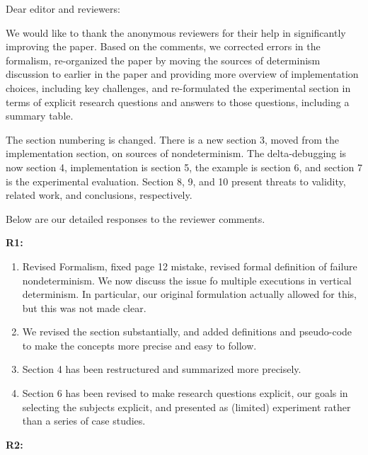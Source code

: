 \documentclass{letter}
\begin{document}
\begin{letter}{}

  \address{Alex Groce\\School of Informatics, Computing \& Cyber Systems\\Northern Arizona University}

  \opening{Dear editor and reviewers:}

We would like to thank the anonymous reviewers for their help in
significantly improving the paper.  Based on the comments, we
corrected errors in the formalism, re-organized the paper by moving
the sources of determinism discussion to earlier in the paper and
providing more overview of implementation choices, including key
challenges, and re-formulated the experimental section in terms of
explicit research questions and answers to those questions, including
a summary table.

The section numbering is changed.  There is a new section 3, moved
from the implementation section, on sources of nondeterminism.  The
delta-debugging is now section 4, implementation is section 5, the
example is section 6, and section 7 is the experimental evaluation.
Section 8, 9, and 10 present threats to validity, related work, and
conclusions, respectively.

Below are our detailed responses to the reviewer comments. 

{\bf R1:}

\begin{enumerate}
\item  Revised Formalism, fixed page 12 mistake, revised formal definition of failure nondeterminism.  We now discuss the issue fo multiple executions in vertical determinism.  In particular, our original formulation actually allowed for this, but this was not made clear.

\item We revised the section substantially, and added definitions and pseudo-code to make the concepts more precise and easy to follow.

\item Section 4 has been restructured and summarized more precisely.

\item Section 6 has been revised to make research questions explicit,
  our goals in selecting the subjects explicit, and presented as
  (limited) experiment rather than a series of case studies.
  \end{enumerate}

{\bf R2:}


\end{letter}
\end{document}
